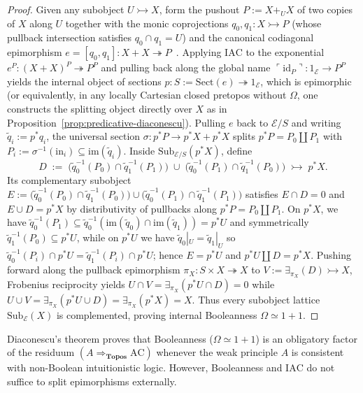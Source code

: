 \documentclass[10pt,twoside,openright]{book}
\theoremstyle{crmplain}
\theoremstyle{crmdef}
\theoremstyle{crmremark}
\begin{document}
\begin{proof}
Given any subobject $U \rightarrowtail X$, form the pushout $P := X +_U X$ of two copies of $X$ along $U$ together with the monic coprojections $q_0, q_1 : X \rightarrowtail P$ (whose pullback intersection satisfies $q_0 \cap q_1 = U$) and the canonical codiagonal epimorphism $e = [q_0, q_1] : X + X \twoheadrightarrow P$~\cite[\S D4.5, Thm.~D4.5.1]{Johnstone02}. Applying $\mathrm{IAC}$ to the exponential $e^P : (X + X)^P \twoheadrightarrow P^P$ and pulling back along the global name $\ulcorner \mathrm{id}_P \urcorner : 1_{\mathcal{E}} \to P^P$ yields the internal object of sections $p : S := \mathrm{Sect}(e) \twoheadrightarrow 1_{\mathcal{E}}$, which is epimorphic (or equivalently, in any locally Cartesian closed pretopos without $\Omega$, one constructs the splitting object directly over $X$ as in Proposition~\ref{prop:predicative-diaconescu}). Pulling $e$ back to $\mathcal{E}/S$ and writing $\tilde{q}_i := p^* q_i$, the universal section $\sigma : p^* P \to p^* X + p^* X$ splits $p^* P = P_0 \amalg P_1$ with $P_i := \sigma^{-1}(\mathrm{in}_i) \subseteq \mathrm{im}(\tilde{q}_i)$. Inside $\mathrm{Sub}_{\mathcal{E}/S}(p^* X)$, define
\[
  D \;:=\; \bigl(\tilde{q}_0^{-1}(P_0) \cap \tilde{q}_1^{-1}(P_1)\bigr) \;\cup\; \bigl(\tilde{q}_0^{-1}(P_1) \cap \tilde{q}_1^{-1}(P_0)\bigr) \;\rightarrowtail\; p^* X.
\]
Its complementary subobject $E := \bigl(\tilde{q}_0^{-1}(P_0) \cap \tilde{q}_1^{-1}(P_0)\bigr) \cup\allowbreak \bigl(\tilde{q}_0^{-1}(P_1) \cap \tilde{q}_1^{-1}(P_1)\bigr)$ satisfies $E \cap D = 0$ and $E \cup D = p^* X$ by distributivity of pullbacks along $p^* P = P_0 \amalg P_1$. On $p^* X$, we have $\tilde{q}_0^{-1}(P_1) \subseteq \tilde{q}_0^{-1}(\mathrm{im}(\tilde{q}_0) \cap \mathrm{im}(\tilde{q}_1)) = p^* U$ and symmetrically $\tilde{q}_1^{-1}(P_0) \subseteq p^* U$, while on $p^* U$ we have $\tilde{q}_0|_U = \tilde{q}_1|_U$ so $\tilde{q}_0^{-1}(P_i) \cap p^* U = \tilde{q}_1^{-1}(P_i) \cap p^* U$; hence $E = p^* U$ and $p^* U \amalg D = p^* X$. Pushing forward along the pullback epimorphism $\pi_X : S \times X \twoheadrightarrow X$ to $V := \exists_{\pi_X}(D) \rightarrowtail X$, Frobenius reciprocity yields $U \cap V = \exists_{\pi_X}(p^* U \cap D) = 0$ while $U \cup V = \exists_{\pi_X}(p^* U \cup D) = \exists_{\pi_X}(p^* X) = X$. Thus every subobject lattice $\mathrm{Sub}_{\mathcal{E}}(X)$ is complemented, proving internal Booleanness $\Omega \simeq 1 + 1$.
\end{proof}

Diaconescu's theorem proves that Booleanness ($\Omega \simeq 1+1$) is an obligatory factor of the residuum $(A \Rightarrow_{\mathbf{Topos}} \mathrm{AC})$ whenever the weak principle $A$ is consistent with non-Boolean intuitionistic logic. However, Booleanness and $\mathrm{IAC}$ do not suffice to split epimorphisms externally.
\end{document}
